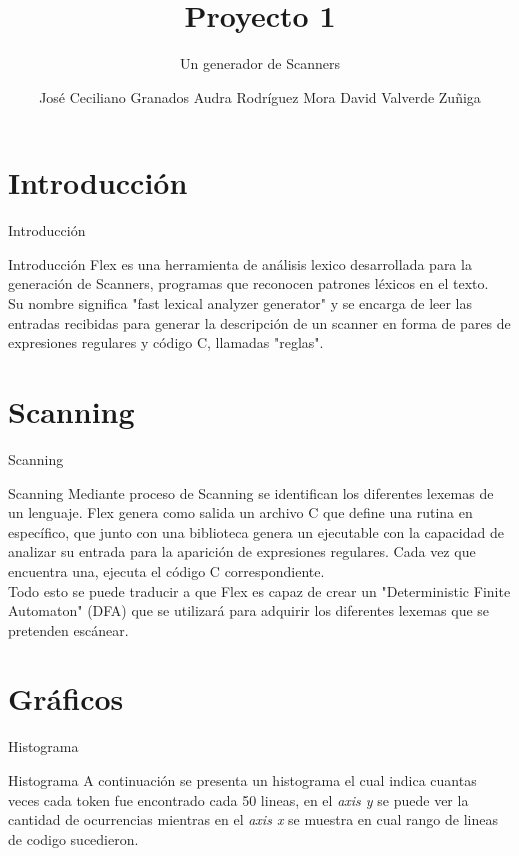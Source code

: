 \documentclass[10pt,xcolor={dvipsnames}]{beamer}
\title{Proyecto 1}
\subtitle{Un generador de Scanners}
\date{}
\author{
    José Ceciliano Granados\newline 2016087245
    \newline \newline
    Audra Rodríguez Mora \newline 2015101893
    \newline \newline
    David Valverde Zuñiga \newline 200922986
}
\institute{Instituto Tecnológico de Costa Rica
    \newline Compiladores e Intérpretes
    \newline I Semestre 2019 }
\begin{document}
    \maketitle

    \section{Introducción}
        \begin{frame}[fragile]{Introducción}
        \begin{alertblock}{Introducción}
                Flex es una herramienta de análisis lexico desarrollada para la generación de Scanners, programas que reconocen patrones léxicos en el texto.\\
                Su nombre significa "fast lexical analyzer generator" y se encarga de leer las entradas recibidas para generar la descripción de un scanner en forma de pares de expresiones regulares y código C, llamadas "reglas".\\

        \end{alertblock}
        \end{frame}

    \section{Scanning}
        \begin{frame}[fragile]{Scanning}
            \begin{alertblock}{Scanning}
                Mediante proceso de Scanning se identifican los diferentes lexemas de un lenguaje. Flex genera como salida un archivo C que define una rutina en específico, que junto con una biblioteca genera un ejecutable con la capacidad de analizar su entrada para la aparición de expresiones regulares. Cada vez que encuentra una, ejecuta el código C correspondiente.\\
                Todo esto se puede traducir a que Flex es capaz de crear un "Deterministic Finite Automaton" (DFA) que se utilizará para adquirir los diferentes lexemas que se pretenden escánear.
            \end{alertblock}
        \end{frame}


    \section{Gráficos}
        \begin{frame}{Histograma}
        \begin{alertblock}{Histograma}
            A continuación se presenta un histograma el cual indica cuantas veces cada token fue encontrado cada 50 lineas, en el \textit{axis y} se puede ver la cantidad de ocurrencias mientras en el \textit{axis x} se muestra en cual rango de lineas de codigo sucedieron.
            \end{alertblock}
        \end{frame}
\end{document}
